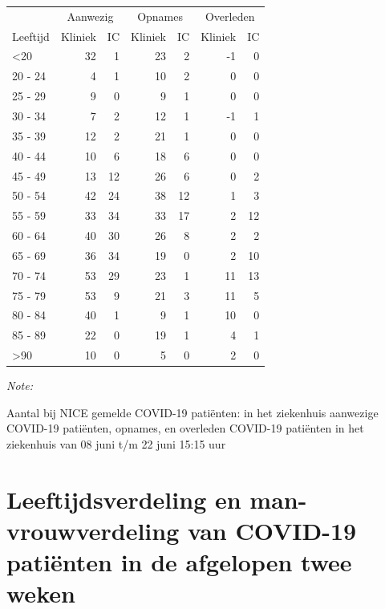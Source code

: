 \documentclass[
  english,
  man,floatsintext]{apa6}
\begin{document}
\begin{table}
\centering\begingroup\fontsize{10}{12}\selectfont

\begin{threeparttable}
\begin{tabular}{lrrrrrr}
\toprule
\multicolumn{1}{c}{ } & \multicolumn{2}{c}{Aanwezig} & \multicolumn{2}{c}{Opnames} & \multicolumn{2}{c}{Overleden} \\
\cmidrule(l{3pt}r{3pt}){2-3} \cmidrule(l{3pt}r{3pt}){4-5} \cmidrule(l{3pt}r{3pt}){6-7}
Leeftijd & Kliniek & IC & Kliniek & IC & Kliniek & IC\\
\midrule
<20 & 32 & 1 & 23 & 2 & -1 & 0\\
20 - 24 & 4 & 1 & 10 & 2 & 0 & 0\\
25 - 29 & 9 & 0 & 9 & 1 & 0 & 0\\
30 - 34 & 7 & 2 & 12 & 1 & -1 & 1\\
35 - 39 & 12 & 2 & 21 & 1 & 0 & 0\\
40 - 44 & 10 & 6 & 18 & 6 & 0 & 0\\
45 - 49 & 13 & 12 & 26 & 6 & 0 & 2\\
50 - 54 & 42 & 24 & 38 & 12 & 1 & 3\\
55 - 59 & 33 & 34 & 33 & 17 & 2 & 12\\
60 - 64 & 40 & 30 & 26 & 8 & 2 & 2\\
65 - 69 & 36 & 34 & 19 & 0 & 2 & 10\\
70 - 74 & 53 & 29 & 23 & 1 & 11 & 13\\
75 - 79 & 53 & 9 & 21 & 3 & 11 & 5\\
80 - 84 & 40 & 1 & 9 & 1 & 10 & 0\\
85 - 89 & 22 & 0 & 19 & 1 & 4 & 1\\
>90 & 10 & 0 & 5 & 0 & 2 & 0\\
\bottomrule
\end{tabular}
\begin{tablenotes}
\item \textit{Note: } 
\item Aantal bij NICE gemelde COVID-19 patiënten: in het ziekenhuis aanwezige COVID-19 patiënten, opnames, en overleden COVID-19 patiënten in het ziekenhuis van 08 juni t/m 22 juni 15:15 uur
\end{tablenotes}
\end{threeparttable}
\endgroup{}
\end{table}

\newpage

\hypertarget{leeftijdsverdeling-en-man-vrouwverdeling-van-covid-19-patiuxebnten-in-de-afgelopen-twee-weken}{%
\section{Leeftijdsverdeling en man-vrouwverdeling van COVID-19 patiënten in de afgelopen twee weken}\label{leeftijdsverdeling-en-man-vrouwverdeling-van-covid-19-patiuxebnten-in-de-afgelopen-twee-weken}}
\end{document}
